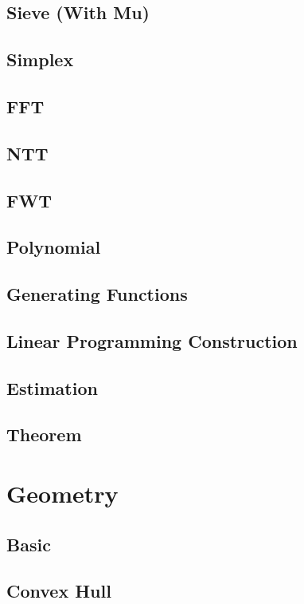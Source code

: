 \subsection{Sieve (With Mu)}

\subsection{Simplex}

\subsection{FFT}

\subsection{NTT}

\subsection{FWT}

\subsection{Polynomial}

\subsection{Generating Functions}

\subsection{Linear Programming Construction}

\subsection{Estimation}

\subsection{Theorem}


\section{Geometry}
\subsection{Basic}

\subsection{Convex Hull}

